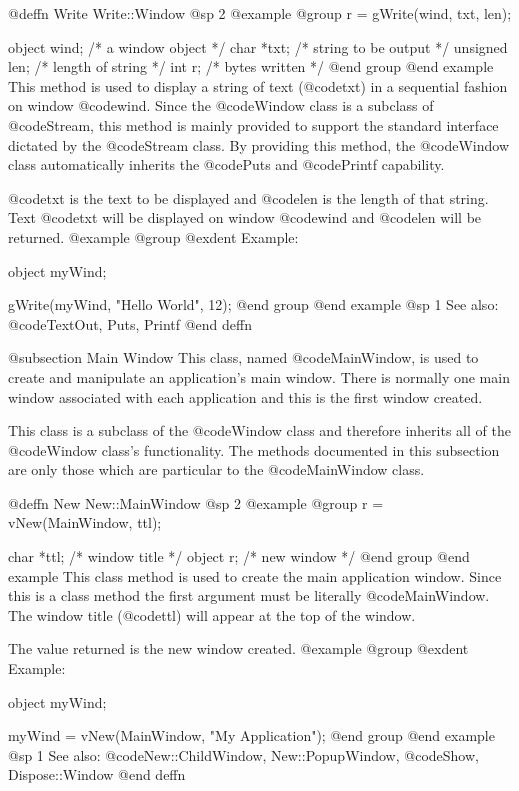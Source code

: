 @deffn {Write} Write::Window
@sp 2
@example
@group
r = gWrite(wind, txt, len);

object   wind;  /*  a window object       */
char    *txt;   /*  string to be output   */
unsigned len;   /*  length of string      */
int      r;     /*  bytes written         */
@end group
@end example
This method is used to display a string of text (@code{txt}) in a sequential
fashion on window @code{wind}.  Since the @code{Window} class is a subclass
of @code{Stream}, this method is mainly provided to support the standard
interface dictated by the @code{Stream} class.  By providing this method,
the @code{Window} class automatically inherits the @code{Puts} and
@code{Printf} capability.

@code{txt} is the text to be displayed and @code{len} is the length of that
string.  Text @code{txt} will be displayed on window @code{wind} and
@code{len} will be returned.
@example
@group
@exdent Example:

object  myWind;

gWrite(myWind, "Hello World\n", 12);
@end group
@end example
@sp 1
See also:  @code{TextOut, Puts, Printf}
@end deffn



@subsection Main Window
This class, named @code{MainWindow}, is used to create and manipulate an
application's main window.  There is normally one main window associated
with each application and this is the first window created.

This class is a subclass of the @code{Window} class and therefore
inherits all of the @code{Window} class's functionality.  The methods
documented in this subsection are only those which are particular
to the @code{MainWindow} class.



@deffn {New} New::MainWindow
@sp 2
@example
@group
r = vNew(MainWindow, ttl);

char    *ttl;   /*  window title  */
object  r;      /*  new window    */
@end group
@end example
This class method is used to create the main application window.
Since this is a class method the first argument must be literally
@code{MainWindow}.  The window title (@code{ttl}) will appear at
the top of the window.

The value returned is the new window created.
@example
@group
@exdent Example:

object  myWind;

myWind = vNew(MainWindow, "My Application");
@end group
@end example
@sp 1
See also:  @code{New::ChildWindow, New::PopupWindow,}
      @code{Show, Dispose::Window}
@end deffn







